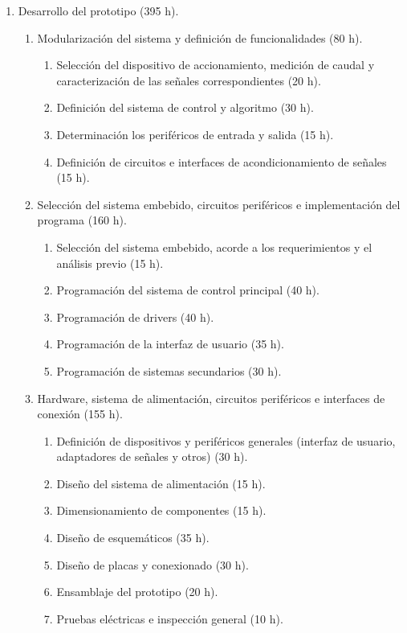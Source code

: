 \documentclass[
11pt, %
]{charter}
\begin{document}
\begin{enumerate}
\item Desarrollo del prototipo (395 h).

	\begin{enumerate}
	\item Modularización del sistema y definición de funcionalidades (80 h).
	
		\begin{enumerate}
		\item Selección del dispositivo de accionamiento, medición de caudal y caracterización de las señales correspondientes (20 h).
		\item Definición del sistema de control y algoritmo (30 h).
		\item Determinación los periféricos de entrada y salida (15 h).
		\item Definición de circuitos e interfaces de acondicionamiento de señales (15 h).
		\end{enumerate}
		
	\item Selección del sistema embebido, circuitos periféricos e implementación del programa (160 h).
	
		\begin{enumerate}
		\item Selección del sistema embebido, acorde a los requerimientos y el análisis previo (15 h).
		\item Programación del sistema de control principal (40 h).
		\item Programación de drivers (40 h).
		\item Programación de la interfaz de usuario (35 h).
		\item Programación de sistemas secundarios (30 h).
		\end{enumerate}

		
	\item Hardware, sistema de alimentación, circuitos periféricos e interfaces de conexión (155 h).
	
		\begin{enumerate}
		\item Definición de dispositivos y periféricos generales (interfaz de usuario, adaptadores de señales y otros) (30 h).
		\item Diseño del sistema de alimentación (15 h).
		\item Dimensionamiento de componentes (15 h).
		\item Diseño de esquemáticos (35 h).
		\item Diseño de placas y conexionado (30 h).
		\item Ensamblaje del prototipo (20 h).
		\item Pruebas eléctricas e inspección general (10 h).
		\end{enumerate}		
		

\end{enumerate}
\end{enumerate}
\end{document}
